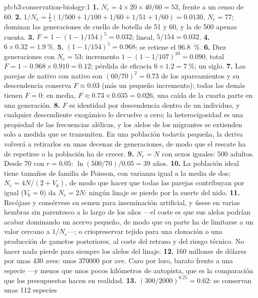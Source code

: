 \begin{solution}{pb:b3:conservation-biology:1}
\textbf{1.} $N_{e} = 4\times 20\times 40/60 = 53$, frente a un censo de 60.
\textbf{2.} $1/N_{e} = \tfrac{1}{5}(1/500 + 1/100 + 1/60 + 1/51 + 1/60) =
0.0130$, $N_{e} = 77$; dominan las generaciones de cuello de botella de
51 y 60, y la de 500 apenas cuenta.
\textbf{3.} $F = 1 - (1 - 1/154)^{5} = 0.032$; lineal, $5/154 = 0.032$.
\textbf{4.} $6\times 0.32 = \qty{1.9}{\%}$.
\textbf{5.} $(1 - 1/154)^{5} = 0.968$: se retiene el \qty{96.8}{\%}.
\textbf{6.} Diez generaciones con $N_{e} = 53$: incremento $1 - (1 -
1/107)^{10} = 0.090$, total $F = 1 - 0.968\times 0.910 = 0.12$; pérdida
de eficacia $6\times 1.2 = \qty{7}{\%}$; un siglo.
\textbf{7.} Las parejas de nativo con nativo son $(60/70)^{2} = 0.73$ de
los apareamientos y su descendencia conserva $F \approx 0.03$ (más un
pequeño incremento); todas las demás tienen $F = 0$: en media,
$F \approx 0.73\times 0.035 = 0.026$, una caída de la cuarta parte en
una generación.
\textbf{8.} $F$ es identidad por descendencia dentro de un individuo, y
cualquier descendiente exogámico lo devuelve a cero; la
heterocigosidad es una propiedad de las frecuencias alélicas, y los
alelos de los migrantes se extienden solo a medida que se transmiten.
En una población todavía pequeña, la deriva volverá a retirarlos en
unas decenas de generaciones, de modo que el rescate ha de repetirse o
la población ha de crecer.
\textbf{9.} $N_{e} = N$ con sexos iguales: 500 adultos. Desde 70 con $r =
0.05$: $\ln(500/70)/0.05 = 39$ años.
\textbf{10.} La población ideal tiene tamaños de familia de Poisson, con
varianza igual a la media de dos; $N_{e} = 4N/(2 + V_{k})$, de modo que
hacer que todas las parejas contribuyan por igual ($V_{k} = 0$) da
$N_{e} = 2N$: ningún linaje se pierde por la suerte del nido.
\textbf{11.} Recójase y consérvese su semen para inseminación
artificial, y úsese en varias hembras sin parentesco a lo largo de los
años ---el coste es que sus alelos podrían acabar dominando un acervo
pequeño, de modo que su parte ha de limitarse a un valor cercano a
$1/N_{e}$---; o criopreservar tejido para una clonación o una
producción de gametos posteriores, al coste del retraso y del riesgo
técnico. No hacer nada pierde para siempre los alelos del linaje.
\textbf{12.} \qty{160}{} millones de dólares por unas 430 aves: unos
\num{370000} por ave. Caro por loro, barato frente a una especie ---y
menos que unos pocos kilómetros de autopista, que es la comparación que
los presupuestos hacen en realidad.
\textbf{13.} $(300/2000)^{0.25} = 0.62$: se conservan unas 112 especies

\end{solution}
